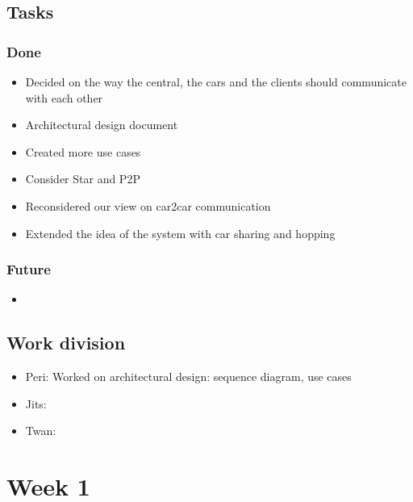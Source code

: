 \documentclass[a4paper]{article}
\begin{document}
\subsection*{Tasks}
\subsubsection*{Done}
\begin{itemize}
    \item Decided on the way the central, the cars and the clients should communicate with each other
    \item Architectural design document
    \item Created more use cases
    \item Consider Star and P2P
    \item Reconsidered our view on car2car communication
    \item Extended the idea of the system with car sharing and hopping
\end{itemize}

\subsubsection*{Future}
\begin{itemize}
    \item 
\end{itemize}

\subsection*{Work division}
\begin{itemize}
    \item Peri: Worked on architectural design: sequence diagram, use cases
    \item Jits:
    \item Twan: 
\end{itemize}

\section*{Week 1}
\end{document}
